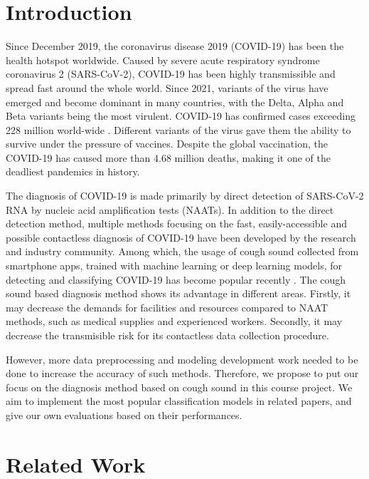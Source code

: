 \documentclass[11pt]{article}
\begin{document}
\section{Introduction}

Since December 2019, the coronavirus disease 2019 (COVID-19) has been the health hotspot worldwide. Caused by severe acute respiratory syndrome coronavirus 2 (SARS-CoV-2), COVID-19 has been highly transmissible and spread fast around the whole world. Since 2021, variants of the virus have emerged and become dominant in many countries, with the Delta, Alpha and Beta variants being the most virulent. COVID-19 has confirmed cases exceeding 228 million world-wide \cite{wiki2021covid19}. Different variants of the virus gave them the ability to survive under the pressure of vaccines. Despite the global vaccination, the COVID-19 has caused more than  4.68 million deaths, making it one of the deadliest pandemics in history.

The diagnosis of COVID-19 is made primarily by direct detection of SARS-CoV-2 RNA by nucleic acid amplification tests (NAATs). In addition to the direct detection method, multiple methods focusing on the fast, easily-accessible and possible contactless diagnosis of COVID-19 have been developed by the research and industry community. Among which, the usage of cough sound collected from smartphone apps, trained with machine learning or deep learning models, for detecting and classifying COVID-19 has become popular recently \cite{xue2021exploring}. The cough sound based diagnosis method shows its advantage in different areas. Firstly, it may decrease the demands for facilities and resources compared to NAAT methods, such as medical supplies and experienced workers. Secondly, it may decrease the transmisible risk for its contactless data collection procedure.

However, more data preprocessing and modeling development work needed to be done to increase the accuracy of such methods. Therefore, we propose to put our focus on the diagnosis method based on cough sound in this course project. We aim to implement the most popular classification models in related papers, and give our own evaluations based on their performances.

\section{Related Work}
\end{document}

